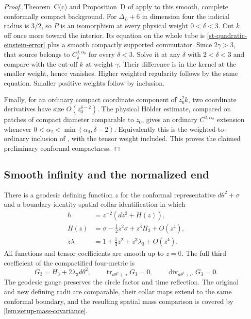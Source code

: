 \begin{proof}
Theorem~C(c) and Proposition~D of \cite{lee2006} apply to this smooth,
complete conformally compact background.  For $\Delta_L+6$ in
dimension four the indicial radius is $3/2$, so $P$ is an
isomorphism at every physical weight $0<\delta<3$.
Cut $k$ off once more toward the interior.  Its equation on the
whole tube is \eqref{st-quadratic-einstein-error} plus a smooth
compactly supported commutator.  Since $2\gamma>3$, that source
belongs to $C^{j,\alpha_0}_\delta$ for every $\delta<3$.
Solve it at any $\delta$ with $2<\delta<3$ and compare with the
cut-off $k$ at weight $\gamma$.  Their difference is in the kernel
at the smaller weight, hence vanishes.  Higher weighted regularity
follows by the same equation.  Smaller positive weights follow by
inclusion.

Finally, for an ordinary compact coordinate component of
$z_0^2k$, two coordinate derivatives have size
$O(z_0^{\delta-2})$.  The physical H\"older estimate, compared on
patches of compact diameter comparable to $z_0$, gives an ordinary
$C^{2,\alpha_2}$ extension whenever
$0<\alpha_2<\min(\alpha_0,\delta-2)$.  Equivalently this is the
weighted-to-ordinary inclusion of \cite[Lemma~3.7(b)]{lee2006},
with the tensor weight included.  This proves the claimed
preliminary conformal compactness.
\end{proof}

\subsection{Smooth infinity and the normalized end}

\begin{proposition}
\label{st-end-regularity}
There is a geodesic defining function $z$ for the conformal
representative $d\theta^2+\sigma$ and a boundary-identity spatial
collar identification in which
\begin{equation}
 \begin{split}
 h&=z^{-2}(dz^2+H(z)),\\
 H(z)&=\sigma-\frac12z^2\sigma+z^3H_3+O(z^4),\\
 z\lambda&=1+\frac14z^2+z^3\lambda_3+O(z^4).
 \end{split}
 \label{st-normalized-expansion}
\end{equation}
All functions and tensor coefficients are smooth up to $z=0$.
The full third coefficient of the compactified four-metric is
\begin{equation}
 G_3=H_3+2\lambda_3d\theta^2,
 \qquad \operatorname{tr}_{d\theta^2+\sigma}G_3=0,
 \qquad \operatorname{div}_{d\theta^2+\sigma}G_3=0.
 \label{st-free-tt-data}
\end{equation}
The geodesic gauge preserves the circle factor and time reflection.
The original and new defining radii are comparable, their collar
maps extend to the same conformal boundary, and the resulting
spatial mass comparison is covered by
\cref{lem:setup-mass-covariance}.
\end{proposition}

